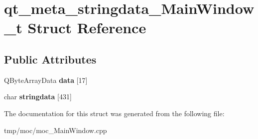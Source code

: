 \hypertarget{structqt__meta__stringdata___main_window__t}{}\section{qt\+\_\+meta\+\_\+stringdata\+\_\+\+Main\+Window\+\_\+t Struct Reference}
\label{structqt__meta__stringdata___main_window__t}
\subsection*{Public Attributes}
\begin{DoxyCompactItemize}
\item 
Q\+Byte\+Array\+Data {\bfseries data} \mbox{[}17\mbox{]}\hypertarget{structqt__meta__stringdata___main_window__t_a392c18d82aabe0692a65dc6fac717b22}{}\label{structqt__meta__stringdata___main_window__t_a392c18d82aabe0692a65dc6fac717b22}

\item 
char {\bfseries stringdata} \mbox{[}431\mbox{]}\hypertarget{structqt__meta__stringdata___main_window__t_aed2e7da8c2facb2b317f017cc24cbbca}{}\label{structqt__meta__stringdata___main_window__t_aed2e7da8c2facb2b317f017cc24cbbca}

\end{DoxyCompactItemize}


The documentation for this struct was generated from the following file\+:\begin{DoxyCompactItemize}
\item 
tmp/moc/moc\+\_\+\+Main\+Window.\+cpp\end{DoxyCompactItemize}
